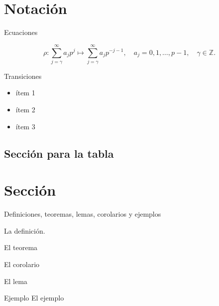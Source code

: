 \section{Notación}

\begin{frame}{Ecuaciones}
	
		\begin{equation}\label{Monna}
		\rho: \sum_{j=\gamma}^{\infty} a_{j} p^{j} \mapsto \sum_{j=\gamma}^{\infty} a_{j} p^{-j-1}, \quad a_{j}=0,1, \ldots, p-1, \quad \gamma \in \mathbb{Z}.
		\end{equation}
\end{frame}

\begin{frame}{Transiciones}
	\begin{itemize}[<+- | alert@+>]
		
		\item ítem 1
		\item ítem 2
		\item ítem 3
		
	\end{itemize}

\end{frame}

\subsection{Sección para la tabla}%
\section*{Sección} %

\begin{frame}{Definiciones, teoremas, lemas, corolarios y ejemplos}
	\begin{df}
		La definición.
	\end{df}
\begin{thh}
	El teorema
\end{thh}
\begin{crr}
	El corolario
\end{crr}
\begin{lm}
	El lema
\end{lm}
\begin{example}{Ejemplo}
	El ejemplo
\end{example}
\end{frame}



